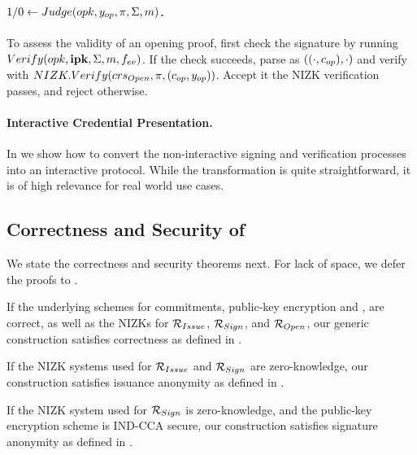 \paragraph{$1/0 \gets Judge(opk,y_{op},\pi,\Sigma,m)$.} %
To assess the validity of an opening proof, first check the signature
by running $Verify(opk,\mathbf{ipk},\Sigma,m,f_{ev})$. If the check succeeds,
parse \Sig as $((\cdot,c_{op}),\cdot)$ and verify \NIZKproof with
$NIZK.Verify(crs_{Open},\pi,(c_{op},y_{op}))$. Accept it the NIZK
verification passes, and reject otherwise.

\paragraph{Interactive Credential Presentation.} In 
we show how to convert the non-interactive signing and verification processes
into an interactive protocol. While the transformation is quite straightforward,
it is of high relevance for real world use cases.

\subsection{Correctness and Security of \CUASGen}
\label{ssec:security-uas}

We state the correctness and security theorems next. For lack of space, we defer
the proofs to .

\begin{theorem}
  \label{thm:correctness-uas}
  If the underlying schemes for commitments, public-key encryption and \SBCM,
  are correct, as well as the NIZKs for $\mathcal{R}_{Issue}$, $\mathcal{R}_{Sign}$,
  and $\mathcal{R}_{Open}$, our generic construction \CUASGen satisfies
  correctness as defined in .
\end{theorem}

\begin{theorem}
  \label{thm:issue-anonymity-uas}
  If the NIZK systems used for $\mathcal{R}_{Issue}$ and $\mathcal{R}_{Sign}$ are
  zero-knowledge, our \CUASGen construction satisfies issuance anonymity as
  defined in .
\end{theorem}

\begin{theorem}
  \label{thm:sign-anonymity-uas}
  If the NIZK system used for $\mathcal{R}_{Sign}$ is zero-knowledge, and the
  public-key encryption scheme is IND-CCA secure, our \CUASGen construction
  satisfies signature anonymity as defined in .
\end{theorem}

